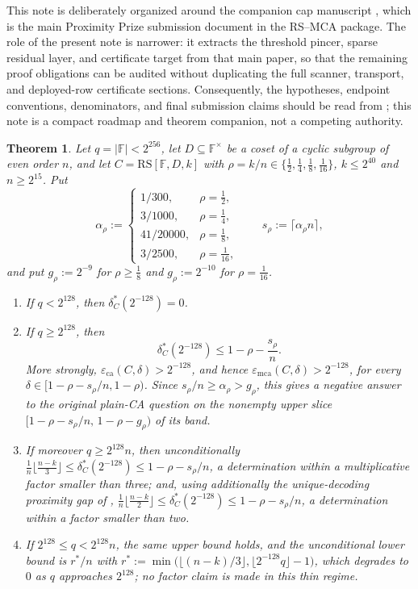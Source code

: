 \documentclass[11pt]{amsart}
\newtheorem{theorem}{Theorem}[section]
\theoremstyle{definition}
\theoremstyle{remark}
\newcommand{\F}{\mathbb{F}}
\newcommand{\RS}{\mathrm{RS}}
\newcommand{\eca}{\varepsilon_{\mathrm{ca}}}
\newcommand{\emca}{\varepsilon_{\mathrm{mca}}}
\begin{document}
This note is deliberately organized around the companion cap manuscript
\cite{Cho26b}, which is the main Proximity Prize submission document in the
RS--MCA package.  The role of the present note is narrower: it extracts the
threshold pincer, sparse residual layer, and certificate target from that main
paper, so that the remaining proof obligations can be audited without
duplicating the full scanner, transport, and deployed-row certificate sections.
Consequently, the hypotheses, endpoint conventions, denominators, and final
submission claims should be read from \cite{Cho26b}; this note is a compact
roadmap and theorem companion, not a competing authority.

\begin{theorem}\label{thm:main}
Let $q=|\F|<2^{256}$, let $D\subseteq\F^\times$ be a coset of a cyclic subgroup of even order $n$, and let $C=\RS[\F,D,k]$ with $\rho=k/n\in\{\tfrac12,\tfrac14,\tfrac18,\tfrac1{16}\}$, $k\le2^{40}$ and $n\ge2^{15}$. Put
\[
\alpha_\rho:=
\begin{cases}
1/300, & \rho=\tfrac12,\\
3/1000, & \rho=\tfrac14,\\
41/20000, & \rho=\tfrac18,\\
3/2500, & \rho=\tfrac1{16},
\end{cases}
\qquad s_\rho:=\lceil\alpha_\rho n\rceil,
\]
and put $g_\rho:=2^{-9}$ for $\rho\ge\tfrac18$ and $g_\rho:=2^{-10}$ for $\rho=\tfrac1{16}$.
\begin{enumerate}
\item If $q<2^{128}$, then $\delta^*_C(2^{-128})=0$.
\item If $q\ge2^{128}$, then
\[
\delta^*_C(2^{-128})\le 1-\rho-\frac{s_\rho}{n}.
\]
More strongly, $\eca(C,\delta)>2^{-128}$, and hence $\emca(C,\delta)>2^{-128}$, for every $\delta\in[1-\rho-s_\rho/n,1-\rho)$. Since $s_\rho/n\ge\alpha_\rho>g_\rho$, this gives a negative answer to the original plain-CA question on the nonempty upper slice $[1-\rho-s_\rho/n,\,1-\rho-g_\rho)$ of its band.
\item If moreover $q\ge2^{128}n$, then unconditionally
$\tfrac1n\bigl\lfloor\tfrac{n-k}3\bigr\rfloor\le\delta^*_C(2^{-128})\le1-\rho-s_\rho/n$,
a determination within a multiplicative factor smaller than three; and, using additionally the unique-decoding proximity gap of \cite{BCIKS20},
$\tfrac1n\bigl\lfloor\tfrac{n-k}2\bigr\rfloor\le\delta^*_C(2^{-128})\le1-\rho-s_\rho/n$,
a determination within a factor smaller than two.
\item If $2^{128}\le q<2^{128}n$, the same upper bound holds, and the unconditional lower bound is $r^*/n$ with $r^*:=\min\bigl(\lfloor(n-k)/3\rfloor,\lfloor2^{-128}q\rfloor-1\bigr)$, which degrades to $0$ as $q$ approaches $2^{128}$; no factor claim is made in this thin regime.
\end{enumerate}
\end{theorem}
\end{document}
